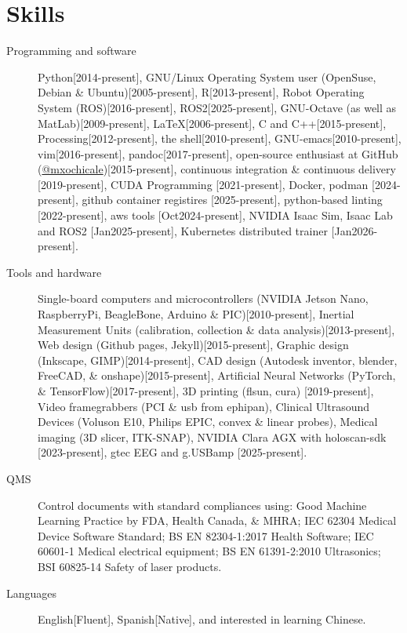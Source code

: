 \documentclass{mycv}
\begin{document}
\section{Skills}
\begin{description}

\item[Programming and software] Python[2014-present],
GNU/Linux Operating System user (OpenSuse, Debian \& Ubuntu)[2005-present],
R[2013-present],
Robot Operating System (ROS)[2016-present],
ROS2[2025-present],
GNU-Octave (as well as MatLab)[2009-present],
\LaTeX [2006-present],
C and C++[2015-present],
Processing[2012-present],
the shell[2010-present],
GNU-emacs[2010-present],
vim[2016-present],
pandoc[2017-present],
open-source enthusiast at GitHub (\href{https://github.com/mxochicale}{@mxochicale})[2015-present],
continuous integration \& continuous delivery [2019-present],
CUDA Programming [2021-present],
Docker, podman [2024-present],
github container registires [2025-present],
python-based linting [2022-present],
aws tools \href{https://github.com/UCL-CDI/cdi-hub/tree/main/tutorials/aws-services/aws-batch}{\faGithub*} [Oct2024-present],
NVIDIA Isaac Sim, Isaac Lab and ROS2 \href{https://github.com/mxochicale/nvidia-open-source-robot-lab}{\faGithub*} [Jan2025-present],
Kubernetes distributed trainer [Jan2026-present].

\item[Tools and hardware]
Single-board computers and microcontrollers (NVIDIA Jetson Nano, RaspberryPi, BeagleBone, Arduino \& PIC)[2010-present],
Inertial Measurement Units (calibration, collection \& data analysis)[2013-present],
Web design (Github pages, Jekyll)[2015-present],
Graphic design (Inkscape, GIMP)[2014-present],
CAD design (Autodesk inventor, blender, FreeCAD, \& onshape)[2015-present],
Artificial Neural Networks (PyTorch, \& TensorFlow)[2017-present],
3D printing (flsun, cura) [2019-present],
Video framegrabbers (PCI \& usb from ephipan),
Clinical Ultrasound Devices (Voluson E10, Philips EPIC, convex \& linear probes),
Medical imaging (3D slicer, ITK-SNAP),
NVIDIA Clara AGX with holoscan-sdk [2023-present],
gtec EEG and g.USBamp [2025-present].

\item[QMS]
Control documents with standard compliances using:
Good Machine Learning Practice by FDA, Health Canada, \& MHRA;
IEC 62304 Medical Device Software Standard;
BS EN 82304-1:2017 Health Software;
IEC 60601-1 Medical electrical equipment;
BS EN 61391-2:2010 Ultrasonics;
BSI 60825-14 Safety of laser products.

\item[Languages] English[Fluent], Spanish[Native], and interested in learning Chinese.

\end{description}
\end{document}
